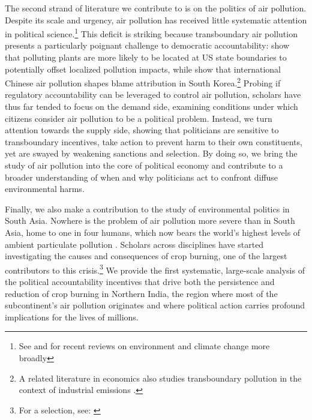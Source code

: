 \documentclass[12pt]{article}
\begin{document}
The second strand of literature we contribute to is on the politics of air pollution. Despite its scale and urgency, air pollution has received little systematic attention in political science.\footnote{See \citet{bar_gulzar2025} and \citet{grossman2026politics} for recent reviews on environment and climate change more broadly} This deficit is striking because transboundary air pollution presents a particularly poignant challenge to democratic accountability: \citet{monogan2017gone} show that polluting plants are more likely to be located at US state boundaries to potentially offset localized pollution impacts, while \citet{LeeVoeten2023} show that international Chinese air pollution shapes blame attribution in South Korea.\footnote{A related literature in economics also studies transboundary pollution in the context of industrial emissions \citep{sigman2002international, kahn2015water, lipscomb2016decentralization}.} Probing if regulatory accountability can be leveraged to control air pollution, scholars have thus far tended to focus on the demand side, examining conditions under which citizens consider air pollution to be a political problem. Instead, we turn attention towards the supply side, showing that politicians are sensitive to transboundary incentives, take action to prevent harm to their own constituents, yet are swayed by weakening sanctions and selection. By doing so, we bring the study of air pollution into the core of political economy and contribute to a broader understanding of when and why politicians act to confront diffuse environmental harms.


Finally, we also make a contribution to the study of environmental politics in South Asia. Nowhere is the problem of air pollution more severe than in South Asia, home to one in four humans, which now bears the world’s highest levels of ambient particulate pollution \citep{pullabhotla2023global}. Scholars across disciplines have started investigating the causes and consequences of crop burning, one of the largest contributors to this crisis.\footnote{For a selection, see: \cite{shyamsundar2019fields, dipoppa2024bureaucrat, garg2023, singh_thachil_2023_airpollution, jack2022money, bhuvaneshwari2019crop}} We provide the first systematic, large-scale analysis of the political accountability incentives that drive both the persistence and reduction of crop burning in Northern India, the region where most of the subcontinent’s air pollution originates and where political action carries profound implications for the lives of millions.
\end{document}
